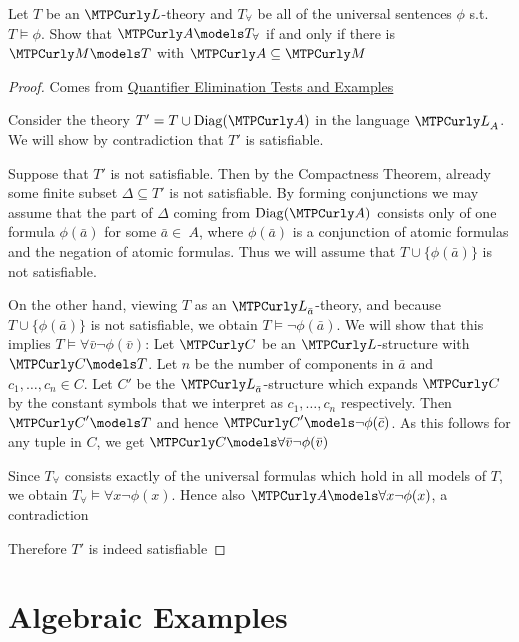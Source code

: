 \documentclass[11pt]{article}
\begin{document}
\begin{exercise}
\label{ex2.5.10}
Let \(T\) be an \(\call\)-theory and \(T_\forall\) be all of the universal
sentences \(\phi\) s.t. \(T\models\phi\). Show that \(\cala\models T_\forall\) if and only
if there is \(\calm\models T\) with \(\cala\subseteq\calm\)
\end{exercise}

\begin{proof}
Comes from \href{http://www.math.uni-konstanz.de/\~eleftheriou/teaching/Masterarbeit.pdf}{Quantifier Elimination Tests and Examples}

Consider the theory \(T'=T\cup\Diag(\cala)\) in the language \(\call_A\). We
will show by contradiction that \(T'\) is satisfiable.

Suppose that \(T'\) is not satisfiable. Then by the Compactness Theorem,
already some finite subset \(\Delta\subseteq T'\) is not satisfiable. By forming
conjunctions we may assume that the part of \(\Delta\) coming from \(\Diag(\cala)\)
consists only of one formula \(\phi(\bar{a})\) for some \(\bar{a}\in\ A\), where
\(\phi(\bar{a})\) is a conjunction of atomic formulas and the negation of atomic
formulas. Thus we will assume that \(T\cup\{\phi(\bar{a})\}\) is not satisfiable.

On the other hand, viewing \(T\) as an \(\call_{\bar{a}}\)-theory, and because
\(T\cup\{\phi(\bar{a})\}\) is not satisfiable, we obtain
\(T\models\neg\phi(\bar{a})\). We will show that this implies
\(T\models\forall\bar{v}\neg\phi(\bar{v})\): Let \(\calc\) be an
\(\call\)-structure with \(\calc\models T\). Let \(n\) be the number of
components in \(\bar{a}\) and \(c_1,\dots,c_n\in C\). Let \(C'\) be the
\(\call_{\bar{a}}\)-structure which expands \(\calc\) by the constant symbols
that we interpret as \(c_1,\dots,c_n\) respectively. Then \(\calc'\models T\) and
hence \(\calc'\models\neg\phi(\bar{c})\). As this follows for any tuple in
\(C\), we get \(\calc\models\forall\bar{v}\neg\phi(\bar{v})\)

Since \(T_\forall\) consists exactly of the universal formulas which hold in all
models of \(T\), we obtain \(T_\forall\models\forall x\neg\phi(x)\). Hence also
\(\cala\models\forall x\neg\phi(x)\), a contradiction

Therefore \(T'\) is indeed satisfiable
\end{proof}

\section{Algebraic Examples}
\label{sec:org5dc34be}
\end{document}
